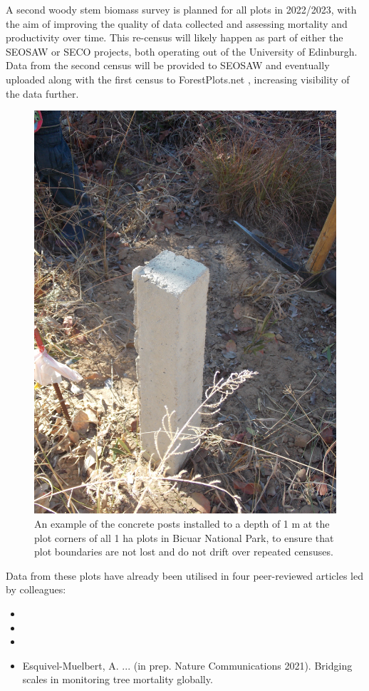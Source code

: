 \begin{refsection}
A second woody stem biomass survey is planned for all plots in 2022/2023, with the aim of improving the quality of data collected and assessing mortality and productivity over time. This re-census will likely happen as part of either the SEOSAW or SECO projects, both operating out of the University of Edinburgh. Data from the second census will be provided to SEOSAW and eventually uploaded along with the first census to ForestPlots.net \citep{LopezGonzalez2011}, increasing visibility of the data further.

\begin{figure}
	\includegraphics[width=0.6\linewidth]{img/concrete}
	\caption[Concrete corner posts in Bicuar National Park]{An example of the concrete posts installed to a depth of 1 m at the plot corners of all 1 ha plots in
	Bicuar National Park, to ensure that plot boundaries are not lost and do not drift over
repeated censuses.}
	\label{legacy:concrete}
\end{figure}

Data from these plots have already been utilised in four peer-reviewed articles led by colleagues:

\begin{itemize}
	\item{}
	\item{}
	\item{}
	\item{Esquivel-Muelbert, A. ... (in prep. Nature Communications 2021). Bridging scales in monitoring tree mortality globally.}
\end{itemize}


\end{refsection}
